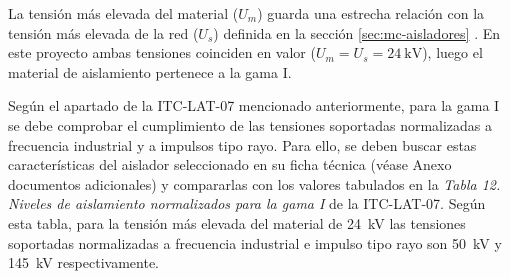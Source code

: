 La tensión más elevada del material ($U_m$) guarda una estrecha relación con la tensión más elevada de la red ($U_s$) definida en la sección \ref{sec:mc-aisladores} . En este proyecto ambas tensiones coinciden en valor ($U_m=U_s=\SI{24}{\kilo\volt}$), luego el material de aislamiento pertenece a la gama I.

Según el apartado de la ITC-LAT-07 mencionado anteriormente, para la gama I se debe comprobar el cumplimiento de las tensiones soportadas normalizadas a frecuencia industrial y a impulsos tipo rayo. Para ello, se deben buscar estas características del aislador seleccionado en su ficha técnica (véase Anexo documentos adicionales) y compararlas con los valores tabulados en la \textit{Tabla 12. Niveles de aislamiento normalizados para la gama I} de la ITC-LAT-07. Según esta tabla, para la tensión más elevada del material de \SI{24}{\kilo\volt} las tensiones soportadas normalizadas a frecuencia industrial e impulso tipo rayo son \SI{50}{\kilo\volt} y \SI{145}{\kilo\volt} respectivamente.

